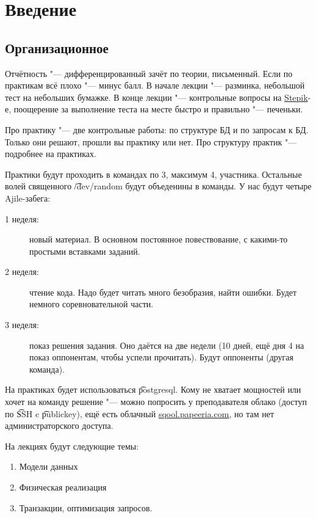 \chapter{Введение}

\section{Организационное}

Отчётность "--- дифференцированный зачёт по теории, письменный.
Если по практикам всё плохо "--- минус балл.
В начале лекции "--- разминка, небольшой тест на небольших бумажке.
В конце лекции "--- контрольные вопросы на \href{http://goo.gl/ptnYrW}{Stepik}-е, поощерение за выполнение теста на месте быстро и правильно "--- печеньки.

Про практику "--- две контрольные работы: по структуре БД и по запросам к БД.
Только они решают, прошли вы практику или нет.
Про структуру практик "--- подробнее на практиках.

Практики будут проходить в командах по 3, максимум 4, участника.
Остальные волей священного \t{/dev/random} будут объеденины в команды.
У нас будут четыре Ajile-забега:
\begin{description}
\item[1 неделя:] новый материал.
	В основном постоянное повествование, с какими-то простыми вставками заданий.

\item[2 неделя:] чтение кода.
	Надо будет читать много безобразия, найти ошибки. Будет немного соревновательной части.

\item[3 неделя:] показ решения задания.
	Оно даётся на две недели (10 дней, ещё дня 4 на показ оппонентам, чтобы успели прочитать). Будут оппоненты (другая команда).
\end{description}

На практиках будет использоваться \t{postgresql}.
Кому не хватает мощностей или хочет на команду решение "--- можно попросить у преподавателя облако (доступ по \t{SSH} c \t{publickey}),
ещё есть облачный \url{sqool.papeeria.com}, но там нет администраторского доступа.

На лекциях будут следующие темы:
\begin{enumerate}
	\item Модели данных
	\item Физическая реализация
	\item Транзакции, оптимизация запросов.
\end{enumerate}

